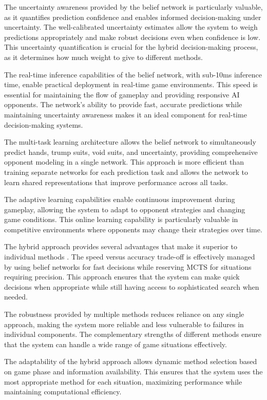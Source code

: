 \documentclass[conference]{IEEEtran}
\begin{document}
The uncertainty awareness provided by the belief network is particularly valuable, as it quantifies prediction confidence and enables informed decision-making under uncertainty. The well-calibrated uncertainty estimates allow the system to weigh predictions appropriately and make robust decisions even when confidence is low. This uncertainty quantification is crucial for the hybrid decision-making process, as it determines how much weight to give to different methods.

The real-time inference capabilities of the belief network, with sub-10ms inference time, enable practical deployment in real-time game environments. This speed is essential for maintaining the flow of gameplay and providing responsive AI opponents. The network's ability to provide fast, accurate predictions while maintaining uncertainty awareness makes it an ideal component for real-time decision-making systems.

The multi-task learning architecture allows the belief network to simultaneously predict hands, trump suits, void suits, and uncertainty, providing comprehensive opponent modeling in a single network. This approach is more efficient than training separate networks for each prediction task and allows the network to learn shared representations that improve performance across all tasks.

The adaptive learning capabilities enable continuous improvement during gameplay, allowing the system to adapt to opponent strategies and changing game conditions. This online learning capability is particularly valuable in competitive environments where opponents may change their strategies over time.

The hybrid approach provides several advantages that make it superior to individual methods \cite{foerster2018counterfactual,lanctot2019vinyals}. The speed versus accuracy trade-off is effectively managed by using belief networks for fast decisions while reserving MCTS for situations requiring precision. This approach ensures that the system can make quick decisions when appropriate while still having access to sophisticated search when needed.

The robustness provided by multiple methods reduces reliance on any single approach, making the system more reliable and less vulnerable to failures in individual components. The complementary strengths of different methods ensure that the system can handle a wide range of game situations effectively.

The adaptability of the hybrid approach allows dynamic method selection based on game phase and information availability. This ensures that the system uses the most appropriate method for each situation, maximizing performance while maintaining computational efficiency.
\end{document}
